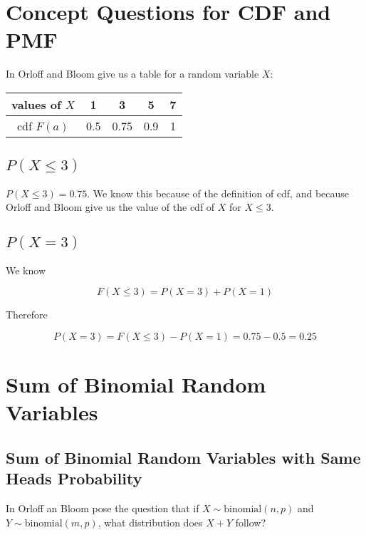 \documentclass[a4paper,11pt]{article}
\begin{document}
\section{Concept Questions for CDF and PMF}
In \cite{slides4} Orloff and Bloom give us a table for a random
variable $X$:

\begin{center}
  \begin{tabular}{ | c | c | c | c | c |}
    \hline
    values of $X$ & 1 & 3 & 5 & 7 \\ \hline
    cdf $F \left( a \right)$ & 0.5 & 0.75 & 0.9 & 1 \\ \hline
  \end{tabular}
\end{center}

\subsection{ $P \left( X \leq 3 \right)$ }
$P \left( X \leq 3 \right) = 0.75$. We know this because of the 
definition of cdf, and because Orloff and Bloom give us the
value of the cdf of $X$ for $X \leq 3$.

\subsection{ $P \left( X = 3 \right)$ }

We know 

\begin{equation}
  F \left( X \leq 3 \right) = P \left( X = 3 \right) 
    + P \left( X = 1 \right)
\end{equation}

Therefore

\begin{equation}
  P \left( X = 3 \right)  = F \left( X \leq 3 \right) 
    - P \left( X = 1 \right) 
    = 0.75 - 0.5 = 0.25
\end{equation}

\section{Sum of Binomial Random Variables}

\subsection{Sum of Binomial Random Variables with Same Heads
  Probability}
In \cite{slides4} Orloff an Bloom pose the question that if
$X \sim \text{binomial} \left( n, p \right)$ and 
$Y \sim \text{binomial} \left( m, p \right)$, what distribution
does $X + Y$ follow?
\end{document}
